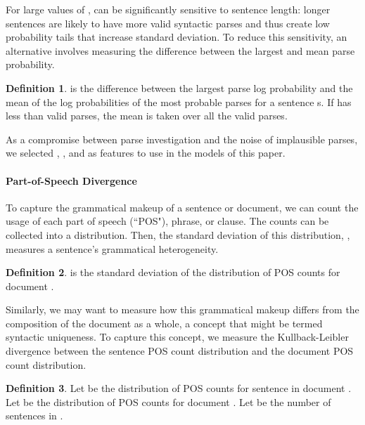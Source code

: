 \documentclass[11pt,a4paper]{article}
\theoremstyle{definition}
\newtheorem{definition}{Definition}[section]
\begin{document}
For large values of ,  can be significantly sensitive to sentence length: longer sentences are likely to have more valid syntactic parses and thus create low probability tails that increase standard deviation. To reduce this sensitivity, an alternative involves measuring the difference between the largest and mean parse probability.

\theoremstyle{definition}
\begin{definition}{}

 is the difference between the largest parse log probability and the mean of the log probabilities of the  most probable parses for a sentence s. If  has less than  valid parses, the mean is taken over all the valid parses.
\end{definition}

As a compromise between parse investigation and the noise of implausible parses, we selected , , and  as features to use in the models of this paper. 

\paragraph{Part-of-Speech Divergence}

To capture the grammatical makeup of a sentence or document, we can count the usage of each part of speech (``POS"), phrase, or clause. The counts can be collected into a distribution. Then, the standard deviation of this distribution, , measures a sentence's grammatical heterogeneity.

\theoremstyle{definition}
\begin{definition}{}

 is the standard deviation of the distribution of POS counts for document .
\end{definition}

Similarly, we may want to measure how this grammatical makeup differs from the composition of the document as a whole, a concept that might be termed syntactic uniqueness. To capture this concept, we measure the Kullback-Leibler divergence \citep{kullbackInformationSufficiency1951} between the sentence POS count distribution and the document POS count distribution.

\theoremstyle{definition}
\begin{definition}{}

Let  be the distribution of POS counts for sentence  in document .
Let  be the distribution of POS counts for document .
Let  be the number of sentences in .

\end{definition}
\end{document}
